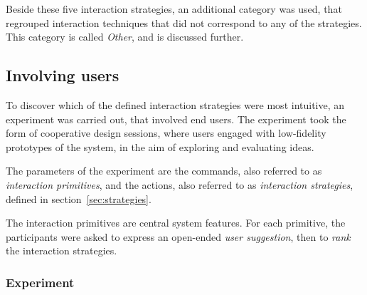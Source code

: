 Beside these five interaction strategies, an additional category was used, that regrouped interaction techniques that did not correspond to any of the strategies.
This category is called \emph{Other}, and is discussed further.


\subsection{Involving users}

To discover which of the defined interaction strategies were most intuitive, an experiment was carried out, that involved end users.
The experiment took the form of cooperative design sessions, where users engaged with low-fidelity prototypes of the system, in the aim of exploring and evaluating ideas.

The parameters of the experiment are the commands, also referred to as \emph{interaction primitives}, and the actions, also referred to as \emph{interaction strategies}, defined in section~\ref{sec:strategies}.

The interaction primitives are central system features.
For each primitive, the participants were asked to express an open-ended \emph{user suggestion}, then to \emph{rank} the interaction strategies.

\subsubsection{Experiment}

